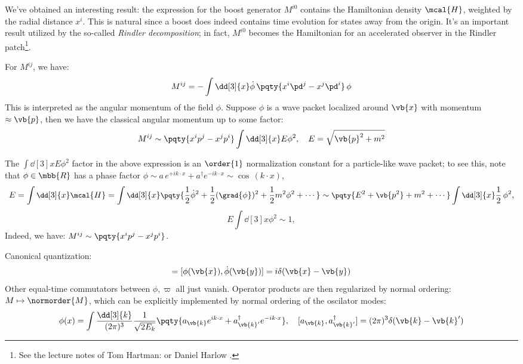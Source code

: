 \documentclass[a4paper,10pt]{article}
\begin{document}
\begin{itemize}
	We've obtained an interesting result: the expression for the boost generator $M^{i0}$ contains the Hamiltonian density $\mcal{H}$, weighted by the radial distance $x^i$. This is natural since a boost does indeed contains time evolution for states away from the origin. It's an important result utilized by the so-called \textit{Rindler decomposition}; in fact, $M^{i0}$ becomes the Hamiltonian for an accelerated observer in the Rindler patch\footnote{
		See the lecture notes of Tom Hartman:  or Daniel Harlow . 
	}. 
	
	For $M^{ij}$, we have:
	\begin{equation}
		M^{ij}
		= - \int \dd[3]{x}
			\dot{\phi}\,\pqty{
				x^i \pd^j
				- x^j \pd^i
			}\,\phi
	\end{equation}
	This is interpreted as the angular momentum of the field $\phi$. Suppose $\phi$ is a wave packet localized around $\vb{x}$ with momentum $\approx \vb{p}$, then we have the classical angular momentum up to some factor:
	\begin{equation}
		M^{ij}
		\sim \pqty{
				x^i p^j
				- x^j p^i
			} \int \dd[3]{x}
				E \phi^2,
	\quad
		E = \sqrt{\vb{p}^2 + m^2}
	\end{equation}
	
	The $
		\int \dd[3]{x} E \phi^2
	$ factor in the above expression is an $\order{1}$ normalization constant for a particle-like wave packet; to see this, note that $\phi\in\mbb{R}$ has a phase factor $
		\phi
		\sim a\,e^{+ik\cdot x} + a^\dagger e^{-ik\cdot x}
		\sim \cos\,(k\cdot x)
	$,
	\begin{gather}
	\small
		E = \int \dd[3]{x} \mcal{H}
		= \int \dd[3]{x} \pqty{
				\frac{1}{2} \dot{\phi}^2
				+ \frac{1}{2} (\grad{\phi})^2
				+ \frac{1}{2} m^2 \phi^2
				+ \cdots
			}
		\sim \pqty{E^2 + \vb{p^2} + m^2 + \cdots}
			\int \dd[3]{x} \frac{1}{2}\,\phi^2,
	\end{gather}
	\vspace{-.7\baselineskip}
	\begin{equation}
		E\int \dd[3]{x} \phi^2 \sim 1,
	\end{equation}
	Indeed, we have: $
		M^{ij}
		\sim \pqty{
				x^i p^j
				- x^j p^i
			}
	$. 
	
	Canonical quantization:
	\begin{gather}
		[\phi(\vb{x}),\varpi(\vb{y})]
		= [\phi(\vb{x}),\dot{\phi}(\vb{y})]
		= i\delta(\vb{x} - \vb{y})
	\end{gather}
	Other equal-time commutators between $\phi,\varpi$ all just vanish. Operator products are then regularized by normal ordering: $M\mapsto \normorder{M}$, which can be explicitly implemented by normal ordering of the oscilator modes:
	\begin{equation}
		\phi(x)
		= \int \frac{\dd[3]{k}}{(2\pi)^3}
			\frac{1}{\sqrt{2E_k}}
			\pqty{
				a_{\vb{k}} e^{ik\cdot x}
				+ a^\dagger_{\vb{k}'} e^{-ik\cdot x}
			},
	\quad
		[a_{\vb{k}}, a^\dagger_{\vb{k}'}]
		= (2\pi)^3 \delta(\vb{k} - \vb{k}')
	\end{equation}
	

\end{itemize}
\end{document}
